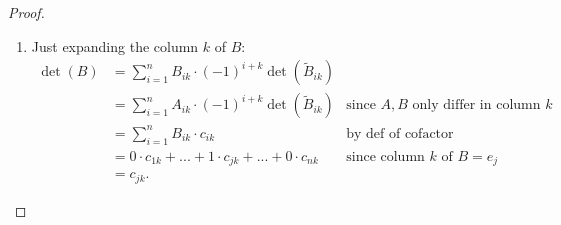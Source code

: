 \begin{proof} \ 

\begin{enumerate}
\item Just expanding the column \(k\) of \(B\):
\begin{align*}
    \det(B) & = \sum_{i = 1}^n B_{ik} \cdot (-1)^{i + k} \det(\tilde{B}_{ik}) \\
            & = \sum_{i = 1}^n A_{ik} \cdot (-1)^{i + k} \det(\tilde{B}_{ik}) & \text{since \(A, B\) only differ in column \(k\)} \\
            & = \sum_{i = 1}^n B_{ik} \cdot c_{ik} & \text{by def of cofactor} \\
            & = 0 \cdot c_{1k} + ... + 1 \cdot c_{jk} + ... + 0 \cdot c_{nk} & \text{since column \(k\) of \(B = e_j\)} \\
            & = c_{jk}.
\end{align*}


\end{enumerate}
\end{proof}
